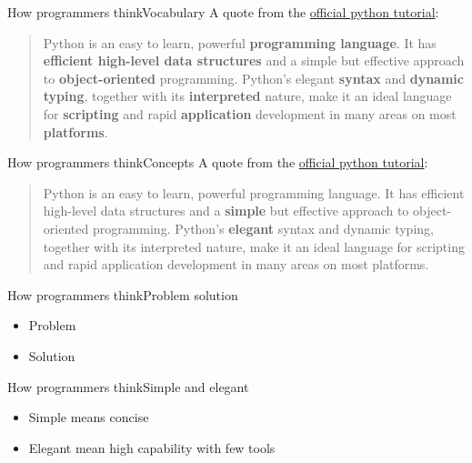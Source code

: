 \documentclass[aspectratio=169]{beamer}
\begin{document}
\begin{frame}{How programmers think}{Vocabulary}
A quote from the \href{https://docs.python.org/3/tutorial/index.html}{official python tutorial}:
\begin{quote}
	Python is an easy to learn, powerful \textbf{programming language}.
	It has \textbf{efficient high-level data structures}
	and a simple but effective approach to \textbf{object-oriented} programming.
	Python’s elegant \textbf{syntax} and \textbf{dynamic typing}, together with its \textbf{interpreted} nature,
	make it an ideal language for \textbf{scripting} and rapid \textbf{application} development in many areas on most \textbf{platforms}.
\end{quote}
\end{frame}

\begin{frame}{How programmers think}{Concepts}
A quote from the \href{https://docs.python.org/3/tutorial/index.html}{official python tutorial}:
\begin{quote}
	Python is an easy to learn, powerful programming language.
	It has efficient high-level data structures
	and a \textbf{simple} but effective approach to object-oriented programming.
	Python’s \textbf{elegant} syntax and dynamic typing, together with its interpreted nature,
	make it an ideal language for scripting and rapid application development in many areas on most platforms.
\end{quote}
\end{frame}

\begin{frame}{How programmers think}{Problem solution}
\begin{itemize}
	\item Problem
	\item Solution
\end{itemize}
\end{frame}

\begin{frame}{How programmers think}{Simple and elegant}
\begin{itemize}
	\item Simple means concise
	\item Elegant mean high capability with few tools
\end{itemize}
\end{frame}
\end{document}

